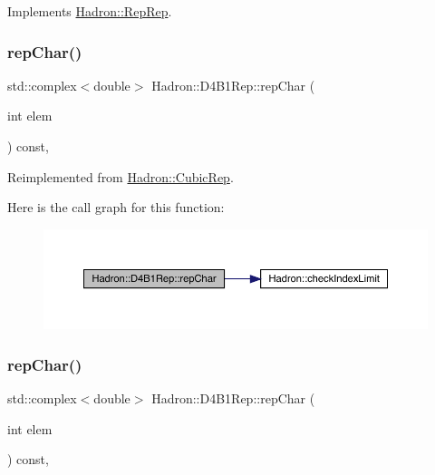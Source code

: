 Implements \mbox{\hyperlink{structHadron_1_1RepRep_ab3213025f6de249f7095892109575fde}{Hadron\+::\+Rep\+Rep}}.

\mbox{\label{structHadron_1_1D4B1Rep_ae49fe8e7bfc46c213d32d7c0d99236f1}} 
\subsubsection{\texorpdfstring{repChar()}{repChar()}\hspace{0.1cm}{\footnotesize\ttfamily [1/3]}}
{\footnotesize\ttfamily std\+::complex$<$double$>$ Hadron\+::\+D4\+B1\+Rep\+::rep\+Char (\begin{DoxyParamCaption}\item[{int}]{elem }\end{DoxyParamCaption}) const\hspace{0.3cm}{\ttfamily [inline]}, {\ttfamily [virtual]}}



Reimplemented from \mbox{\hyperlink{structHadron_1_1CubicRep_af45227106e8e715e84b0af69cd3b36f8}{Hadron\+::\+Cubic\+Rep}}.

Here is the call graph for this function\+:
\nopagebreak
\begin{figure}[H]
\begin{center}
\leavevmode
\includegraphics[width=350pt]{d6/d99/structHadron_1_1D4B1Rep_ae49fe8e7bfc46c213d32d7c0d99236f1_cgraph}
\end{center}
\end{figure}
\mbox{\label{structHadron_1_1D4B1Rep_ae49fe8e7bfc46c213d32d7c0d99236f1}} 
\subsubsection{\texorpdfstring{repChar()}{repChar()}\hspace{0.1cm}{\footnotesize\ttfamily [2/3]}}
{\footnotesize\ttfamily std\+::complex$<$double$>$ Hadron\+::\+D4\+B1\+Rep\+::rep\+Char (\begin{DoxyParamCaption}\item[{int}]{elem }\end{DoxyParamCaption}) const\hspace{0.3cm}{\ttfamily [inline]}, {\ttfamily [virtual]}}



